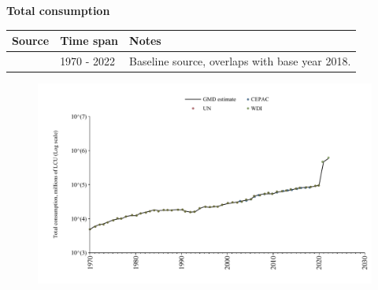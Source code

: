 \documentclass[12pt,a4paper,landscape]{article}
\begin{document}
\begin{adjustbox}{max totalsize={\paperwidth}{\paperheight},center}
\begin{minipage}[t][\textheight][t]{\textwidth}
\vspace*{0.5cm}
{}
\begin{center}
{\Large\bfseries Total consumption}
\end{center}
\vspace{0.5cm}
\begin{table}[H]
\centering
\small
\begin{tabular}{|l|l|l|}
\hline
\textbf{Source} & \textbf{Time span} & \textbf{Notes} \\
\hline
\rowcolor{white}\cite{WDI}& 1970 - 2022 &Baseline source, overlaps with base year 2018. \\
\hline
\end{tabular}
\end{table}
\begin{figure}[H]
\centering
\includegraphics[width=\textwidth,height=0.6\textheight,keepaspectratio]{graphs/CUB_cons.pdf}
\end{figure}
\end{minipage}
\end{adjustbox}
\end{document}

